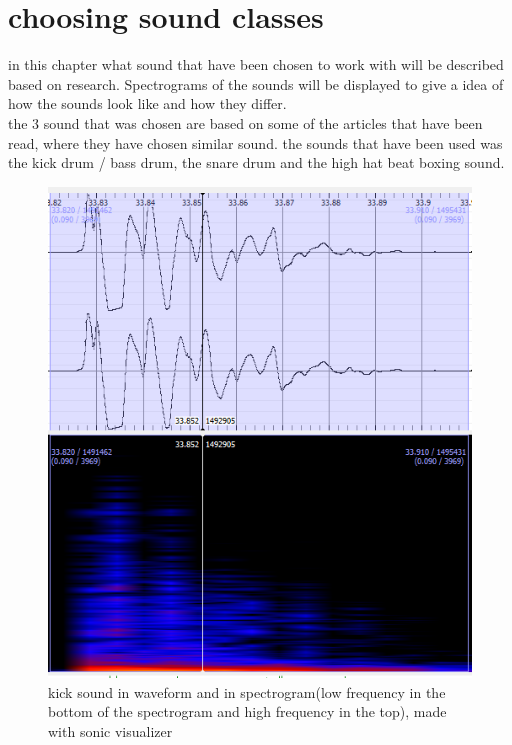 \section{choosing sound classes}
in this chapter what sound that have been chosen to work with will be described based on research. Spectrograms of the sounds will be displayed to give a idea of how the sounds look like and how they differ.\\
the 3 sound that was chosen are based on some of the articles that have been read, where they have chosen similar sound\citep{Stowell2010}\citep{QBBB}. the sounds that have been used was the kick drum / bass drum, the snare drum and the high hat beat boxing sound.\\
\begin{figure}[h]
	\begin{center}
		\includegraphics[scale = 0.5]{fig/Kick-closeup-with-spectrogram.png}
		\caption{kick sound in waveform and in spectrogram(low frequency in the bottom of the spectrogram and high frequency in the top), made with sonic visualizer}
		\label{KickCloseup}
	\end{center}
\end{figure} 
